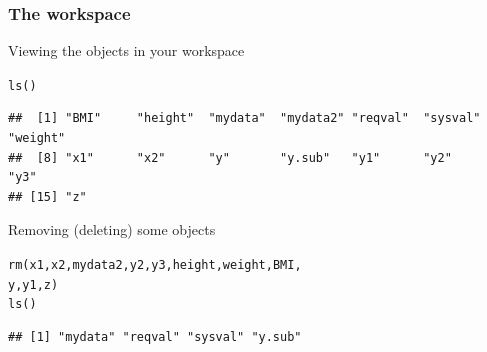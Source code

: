 \documentclass[color=usenames,dvipsnames]{beamer}\usepackage[]{graphicx}\usepackage[]{color}
\makeatletter
\newcommand{\hlstd}[1]{\textcolor[rgb]{0,0,0}{#1}}%
\newcommand{\hlkwd}[1]{\textcolor[rgb]{0.004,0.004,0.506}{#1}}%
\newenvironment{kframe}{%
 \def\at@end@of@kframe{}%
 \ifinner\ifhmode%
  \def\at@end@of@kframe{\end{minipage}}%
  \begin{minipage}{\columnwidth}%
 \fi\fi%
 \def\FrameCommand##1{\hskip\@totalleftmargin \hskip-\fboxsep
 \colorbox{shadecolor}{##1}\hskip-\fboxsep
     \hskip-\linewidth \hskip-\@totalleftmargin \hskip\columnwidth}%
 \MakeFramed {\advance\hsize-\width
   \@totalleftmargin\z@ \linewidth\hsize
   \@setminipage}}%
 {\par\unskip\endMakeFramed%
 \at@end@of@kframe}
\newenvironment{knitrout}{}{} %
\makeatother
\begin{document}
\begin{frame}[fragile]
  \frametitle{The workspace}
  Viewing the objects in your workspace
\begin{knitrout}\small
{}\color{fgcolor}\begin{kframe}
\begin{alltt}
\hlkwd{ls}\hlstd{()}
\end{alltt}
\begin{verbatim}
##  [1] "BMI"     "height"  "mydata"  "mydata2" "reqval"  "sysval"  "weight" 
##  [8] "x1"      "x2"      "y"       "y.sub"   "y1"      "y2"      "y3"     
## [15] "z"
\end{verbatim}
\end{kframe}
\end{knitrout}
\pause \vfill
Removing (deleting) some objects
\begin{knitrout}
\color{fgcolor}\begin{kframe}
\begin{alltt}
\hlkwd{rm}\hlstd{(x1, x2, mydata2, y2, y3, height, weight, BMI,}
   \hlstd{y, y1, z)}
\hlkwd{ls}\hlstd{()}
\end{alltt}
\begin{verbatim}
## [1] "mydata" "reqval" "sysval" "y.sub"
\end{verbatim}
\end{kframe}
\end{knitrout}
\end{frame}
\end{document}
